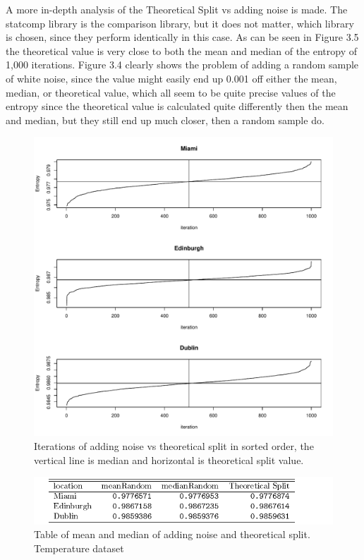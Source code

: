 A more in-depth analysis of the Theoretical Split vs adding noise is made. The statcomp library is the comparison library, but it does not matter, which library is chosen, since they perform identically in this case. As can be seen in Figure 3.5 the theoretical value is very close to both the mean and median of the entropy of 1,000 iterations. Figure 3.4 clearly shows the problem of adding a random sample of white noise, since the value might easily end up 0.001 off either the mean, median, or theoretical value, which all seem to be quite precise values of the entropy since the theoretical value is calculated quite differently then the mean and median, but they still end up much closer, then a random sample do. 

\begin{figure}
    \centering
    \includegraphics[width=\textwidth,keepaspectratio]{Weather/noiseStochasticTheoretical.pdf}
    \caption{Iterations of adding noise vs theoretical split in sorted order, the vertical line is median and horizontal is theoretical split value.}
\end{figure}

\begin{figure}
    \centering
    \includegraphics[width=\textwidth,keepaspectratio]{Weather/random_vs_theoreticalSplit.pdf}
    \caption{Table of mean and median of adding noise and theoretical split. Temperature dataset}
\end{figure}

